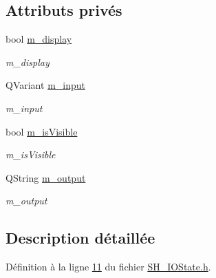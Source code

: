 \subsection*{Attributs privés}
\begin{DoxyCompactItemize}
\item 
bool \hyperlink{classSH__InOutState_a3351fa53593266a1ae4334d33d0b1610}{m\-\_\-display}
\begin{DoxyCompactList}\small\item\em m\-\_\-display \end{DoxyCompactList}\item 
Q\-Variant \hyperlink{classSH__InOutState_ae43d6fdc62047f285913837648a1e883}{m\-\_\-input}
\begin{DoxyCompactList}\small\item\em m\-\_\-input \end{DoxyCompactList}\item 
bool \hyperlink{classSH__InOutState_a8fd66b185c9a55f0e84daa97e2acf53a}{m\-\_\-is\-Visible}
\begin{DoxyCompactList}\small\item\em m\-\_\-is\-Visible \end{DoxyCompactList}\item 
Q\-String \hyperlink{classSH__InOutState_ae735e741ce229d2600448d8daa0abc2d}{m\-\_\-output}
\begin{DoxyCompactList}\small\item\em m\-\_\-output \end{DoxyCompactList}\end{DoxyCompactItemize}


\subsection{Description détaillée}


Définition à la ligne \hyperlink{SH__IOState_8h_source_l00011}{11} du fichier \hyperlink{SH__IOState_8h_source}{S\-H\-\_\-\-I\-O\-State.\-h}.



